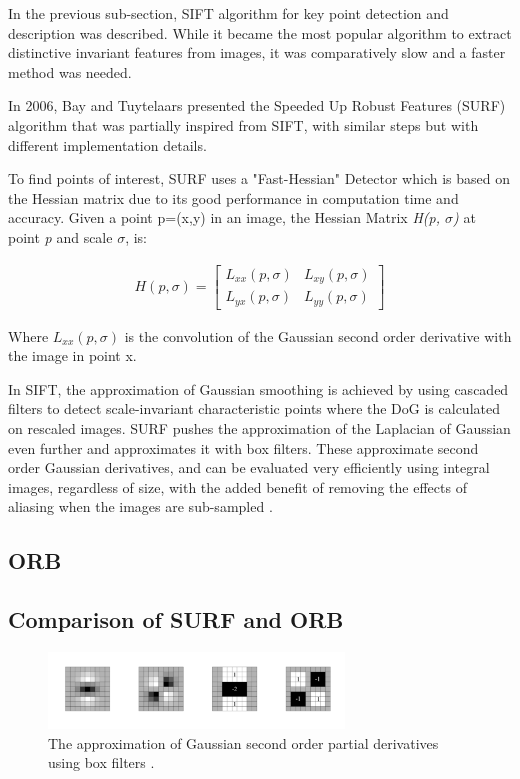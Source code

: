 \documentclass{l4proj}
\begin{document}
In the previous sub-section, SIFT algorithm for key point detection and description was described. While it became the most popular algorithm to extract distinctive invariant features from images, it was comparatively slow and a faster method was needed.

In 2006, Bay and Tuytelaars presented the Speeded Up Robust Features (SURF) algorithm that was partially inspired from SIFT, with similar steps but with different implementation details. 

To find points of interest, SURF uses a "Fast-Hessian" Detector which is based on the Hessian matrix due to its good performance in computation time and accuracy. Given a point p=(x,y) in an image, the Hessian Matrix \textit{H(p, $\sigma$)} at point \textit{p} and scale \textit{$\sigma$}, is: 

\begin{align}
 H(p,\sigma) = \begin{bmatrix}L_{xx}(p, \sigma) &L_{xy}(p, \sigma)  \\L_{yx}(p, \sigma) & L_{yy}(p, \sigma) \end{bmatrix}
\end{align}


Where $L_{xx}(p, \sigma)$ is the convolution of the Gaussian second order derivative with the image in point x. 

In SIFT, the approximation of Gaussian smoothing is achieved by using cascaded filters to detect scale-invariant characteristic points where the DoG is calculated on rescaled images. SURF pushes the approximation of the Laplacian of Gaussian even further and approximates it with box filters. These approximate second order Gaussian derivatives, and can be evaluated very efficiently using integral images, regardless of size, with the added benefit of removing the effects of aliasing when the images are sub-sampled \citep{Bay08}.


\subsection{ORB}



\subsection{Comparison of SURF and ORB}




\begin{figure}[ht]
    \centering
    \includegraphics[width=0.7\textwidth]{l4template-master/images/boxfilters.png}
    \caption{The approximation of Gaussian second order partial derivatives using box filters \citep{Bay08}.}
    \label{boxfilters}
\end{figure}
\end{document}
